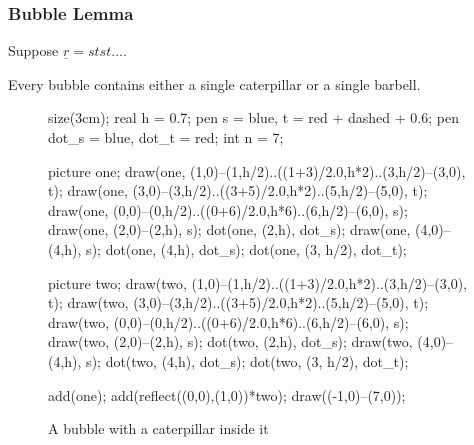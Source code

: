 \documentclass[pdf]{beamer}
\theoremstyle{definition}
\def\ul#1{\underline{#1}}
\begin{document}
\begin{frame}[fragile]
	\frametitle{Bubble Lemma}
	Suppose $\ul r = stst\dots$.

	\begin{lemma}
		Every bubble contains either a single caterpillar or a single barbell.
	\end{lemma}
	\begin{figure}[ht]
		\centering
		\begin{asy}
		size(3cm);
		real h = 0.7;
		pen s = blue, t = red + dashed + 0.6;
		pen dot_s = blue, dot_t = red;
		int n = 7;

		picture one;
		draw(one, (1,0)--(1,h/2)..((1+3)/2.0,h*2)..(3,h/2)--(3,0), t);
		draw(one, (3,0)--(3,h/2)..((3+5)/2.0,h*2)..(5,h/2)--(5,0), t);
		draw(one, (0,0)--(0,h/2)..((0+6)/2.0,h*6)..(6,h/2)--(6,0), s);
		draw(one, (2,0)--(2,h), s);
		dot(one, (2,h), dot_s);
		draw(one, (4,0)--(4,h), s);
		dot(one, (4,h), dot_s);
		dot(one, (3, h/2), dot_t);

		picture two;
		draw(two, (1,0)--(1,h/2)..((1+3)/2.0,h*2)..(3,h/2)--(3,0), t);
		draw(two, (3,0)--(3,h/2)..((3+5)/2.0,h*2)..(5,h/2)--(5,0), t);
		draw(two, (0,0)--(0,h/2)..((0+6)/2.0,h*6)..(6,h/2)--(6,0), s);
		draw(two, (2,0)--(2,h), s);
		dot(two, (2,h), dot_s);
		draw(two, (4,0)--(4,h), s);
		dot(two, (4,h), dot_s);
		dot(two, (3, h/2), dot_t);

		add(one); add(reflect((0,0),(1,0))*two);
		draw((-1,0)--(7,0));
		\end{asy}
		\caption{A bubble with a caterpillar inside it}
	\end{figure}
\end{frame}
\end{document}
